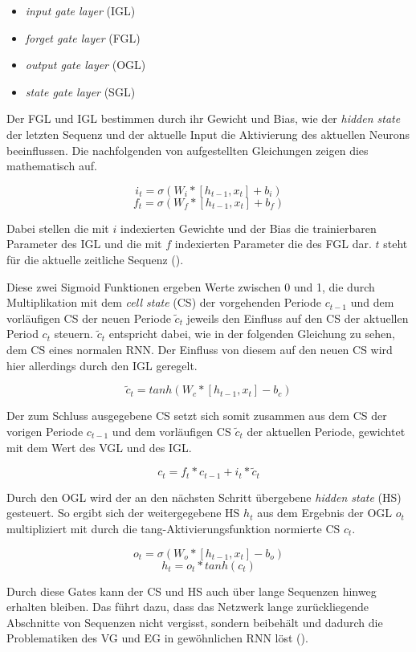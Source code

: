\begin{itemize}
    \item \textit{input gate layer} (IGL)
    \item \textit{forget gate layer} (FGL)
    \item \textit{output gate layer} (OGL)
    \item \textit{state gate layer} (SGL)
\end{itemize}

Der FGL und IGL bestimmen durch ihr Gewicht und Bias, wie der \textit{hidden state} der letzten Sequenz und der aktuelle Input die Aktivierung des aktuellen Neurons beeinflussen. Die nachfolgenden von \cite{simao2019emg} aufgestellten Gleichungen zeigen dies mathematisch auf.

$$i_t=\sigma(W_i*[h_{t-1}, x_t]+b_i)$$
$$f_t=\sigma(W_f*[h_{t-1}, x_t]+b_f)$$

Dabei stellen die mit $i$ indexierten Gewichte und der Bias die trainierbaren Parameter des IGL und die mit $f$ indexierten Parameter die des FGL dar. $t$ steht für die aktuelle zeitliche Sequenz (\cite{simao2019emg}). 

Diese zwei Sigmoid Funktionen ergeben Werte zwischen 0 und 1, die durch Multiplikation mit dem \textit{cell state} (CS) der vorgehenden Periode $c_{t-1}$ und dem vorläufigen CS der neuen Periode $\widetilde{c}_t$ jeweils den Einfluss auf den CS der aktuellen Period $c_t$ steuern. $\widetilde{c}_t$ entspricht dabei, wie in der folgenden Gleichung zu sehen, dem CS eines normalen RNN. Der Einfluss von diesem auf den neuen CS wird hier allerdings durch den IGL geregelt.

$$\widetilde{c}_t=tanh(W_c*[h_{t-1}, x_t]-b_c)$$

Der zum Schluss ausgegebene CS setzt sich somit zusammen aus dem CS der vorigen Periode $c_{t-1}$ und dem vorläufigen CS $\widetilde{c}_t$ der aktuellen Periode, gewichtet mit dem Wert des VGL und des IGL.

$$c_t=f_t*c_{t-1}+i_t*\widetilde{c}_t$$

Durch den OGL wird der an den nächsten Schritt übergebene \textit{hidden state} (HS) gesteuert. So ergibt sich der weitergegebene HS $h_t$ aus dem Ergebnis der OGL $o_t$ multipliziert mit durch die tang-Aktivierungsfunktion normierte CS $c_t$.

$$o_t=\sigma(W_o*[h_{t-1}, x_t]-b_o)$$
$$h_t=o_t*tanh(c_t)$$

Durch diese Gates kann der CS und HS auch über lange Sequenzen hinweg erhalten bleiben. Das führt dazu, dass das Netzwerk lange zurückliegende Abschnitte von Sequenzen nicht vergisst, sondern beibehält und dadurch die Problematiken des VG und EG in gewöhnlichen RNN löst (\cite{simao2019emg}). 

